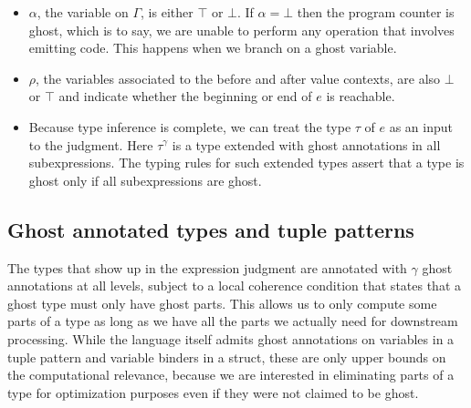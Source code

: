 \documentclass[acmsmall,nonacm]{acmart}
\begin{document}
\begin{itemize}
  \item $\alpha$, the variable on $\Gamma$, is either $\top$ or $\bot$. If $\alpha=\bot$ then the program counter is ghost, which is to say, we are unable to perform any operation that involves emitting code. This happens when we branch on a ghost variable.
  \item $\rho$, the variables associated to the before and after value contexts, are also $\bot$ or $\top$ and indicate whether the beginning or end of $e$ is reachable.
  \item Because type inference is complete, we can treat the type $\tau$ of $e$ as an input to the judgment. Here $\tau^{\gamma}$ is a type extended with ghost annotations in all subexpressions. The typing rules for such extended types assert that a type is ghost only if all subexpressions are ghost.
\end{itemize}

\subsection{Ghost annotated types and tuple patterns}

The types that show up in the expression judgment are annotated with $\gamma$ ghost annotations at all levels, subject to a local coherence condition that states that a ghost type must only have ghost parts. This allows us to only compute some parts of a type as long as we have all the parts we actually need for downstream processing. While the language itself admits ghost annotations on variables in a tuple pattern and variable binders in a struct, these are only upper bounds on the computational relevance, because we are interested in eliminating parts of a type for optimization purposes even if they were not claimed to be ghost.
\end{document}
